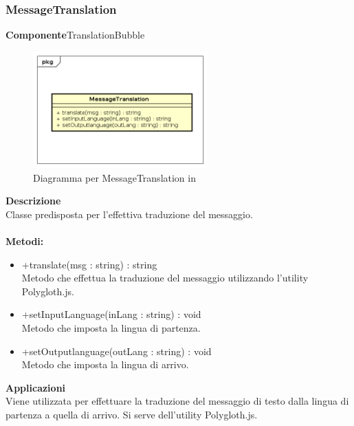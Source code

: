 \clearpage

\subsubsection{MessageTranslation}
\textbf{Componente}TranslationBubble\\
   \FloatBarrier
   \begin{figure}[ht]
   \centering
   \includegraphics[width=0.6\textwidth]{img/single-MessageTranslation}
   \caption{{Diagramma per MessageTranslation in }}
\end{figure}
\FloatBarrier
\textbf{Descrizione}\\
Classe predisposta per l'effettiva traduzione del messaggio.
\\
\\
\textbf{Metodi:} 
\begin{itemize}
\item +translate(msg : string) : string 
\\
Metodo che effettua la traduzione del messaggio utilizzando l'utility Polygloth.js.
\item +setInputLanguage(inLang : string) : void 
\\
Metodo che imposta la lingua di partenza.
\item +setOutputlanguage(outLang : string) : void 
\\
Metodo che imposta la lingua di arrivo.
\end{itemize} 


\textbf{Applicazioni}\\
Viene utilizzata per effettuare la traduzione del messaggio di testo dalla lingua di partenza a quella di arrivo. Si serve dell'utility Polygloth.js. 


\clearpage


